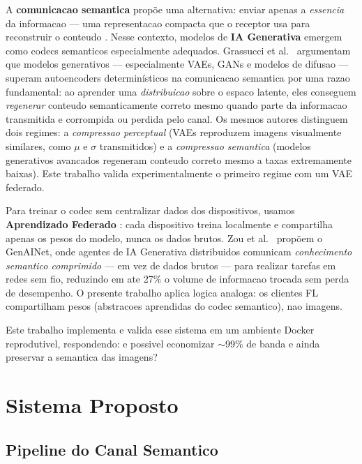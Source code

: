 \documentclass[conference]{IEEEtran}
\begin{document}
A \textbf{comunicacao semantica} propõe uma alternativa: enviar apenas
a \textit{essencia} da informacao --- uma representacao compacta que o receptor
usa para reconstruir o conteudo \cite{yang2022semantic, xie2021deep}.
Nesse contexto, modelos de \textbf{IA Generativa} emergem como codecs
semanticos especialmente adequados. Grassucci et al.~\cite{grassucci2023genai_meets_semcom}
argumentam que modelos generativos --- especialmente VAEs, GANs e modelos de
difusao --- superam autoencoders determinísticos na comunicacao semantica por
uma razao fundamental: ao aprender uma \textit{distribuicao} sobre o espaco
latente, eles conseguem \textit{regenerar} conteudo semanticamente correto mesmo
quando parte da informacao transmitida e corrompida ou perdida pelo canal.
Os mesmos autores distinguem dois regimes: a \textit{compressao perceptual}
(VAEs reproduzem imagens visualmente similares, como $\mu$ e $\sigma$ transmitidos)
e a \textit{compressao semantica} (modelos generativos avancados regeneram
conteudo correto mesmo a taxas extremamente baixas). Este trabalho valida
experimentalmente o primeiro regime com um VAE federado.

Para treinar o codec sem centralizar dados dos dispositivos, usamos
\textbf{Aprendizado Federado} \cite{mcmahan2017}: cada dispositivo treina
localmente e compartilha apenas os pesos do modelo, nunca os dados brutos.
Zou et al.~\cite{du2023genainet} propõem o GenAINet, onde agentes de IA
Generativa distribuidos comunicam \textit{conhecimento semantico comprimido} ---
em vez de dados brutos --- para realizar tarefas em redes sem fio, reduzindo
em ate 27\% o volume de informacao trocada sem perda de desempenho.
O presente trabalho aplica logica analoga: os clientes FL compartilham pesos
(abstracoes aprendidas do codec semantico), nao imagens.

Este trabalho implementa e valida esse sistema em um ambiente Docker
reprodutivel, respondendo: e possivel economizar $\sim$99\% de banda
e ainda preservar a semantica das imagens?


\section{Sistema Proposto}

\subsection{Pipeline do Canal Semantico}
\end{document}
